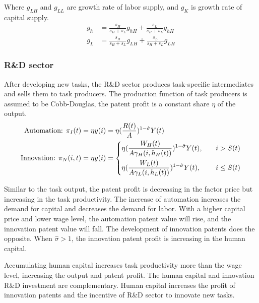 \documentclass[12pt]{article}
\begin{document}
Where $g_{LH}$ and $g_{LL}$ are growth rate of labor supply, and $g_K$ is growth rate of capital supply. 
\begin{align*}
g_h &= \frac{s_H}{s_H+s_L}g_{hH}+\frac{s_L}{s_H+s_L}g_{hH} \\
g_L &= \frac{s_H}{s_H+s_L}g_{LH}+\frac{s_L}{s_H+s_L}g_{LH}
\end{align*}

\subsubsection*{R\&D sector}
After developing new tasks, the R\&D sector produces task-specific intermediates and sells them to task producers. The production function of task producers is assumed to be Cobb-Douglas, the patent profit is a constant share $\eta$ of the output. 
\begin{align*}
\text{Automation: } \pi_I(t)& =\eta y(i) = \eta(\frac{R(t)}{A})^{1-\hat{\sigma}}Y(t)\\
\text{Innovation: } \pi_N(i,t)&= \eta y(i) = 
\begin{dcases}
\eta(\frac{W_H(t)}{A\gamma_H(i,h_H(t))})^{1-\hat{\sigma}}Y(t),  \quad & i>S(t)  \\
\eta(\frac{W_L(t)}{A\gamma_L(i,h_L(t))})^{1-\hat{\sigma}}Y(t),  \quad & i \leq S(t)
\end{dcases}
\end{align*}

Similar to the task output, the patent profit is decreasing in the factor price but increasing in the task productivity. The increase of automation increases the demand for capital and decreases the demand for labor. With a higher capital price and lower wage level, the automation patent value will rise, and the innovation patent value will fall. The development of innovation patents does the opposite. When $\hat{\sigma}>1$, the innovation patent profit is increasing in the human capital. 

Accumulating human capital increases task productivity more than the wage level, increasing the output and patent profit. The human capital and innovation R\&D investment are complementary. Human capital increases the profit of innovation patents and the incentive of R\&D sector to innovate new tasks. 
\end{document}
